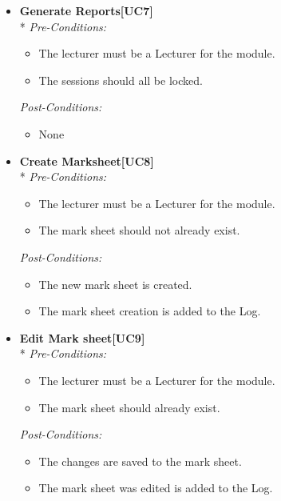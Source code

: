 \documentclass[a4paper]{article}
\begin{document}
\begin{itemize}
				\item	\textbf{Generate Reports[UC7]}\\*
						\textit{Pre-Conditions:}
								\begin{itemize}
									\item The lecturer must be a Lecturer for the module.
									\item The sessions should all be locked.
								\end{itemize}
								
						\textit{Post-Conditions:}
								\begin{itemize}
									\item None
								\end{itemize}
														
				\item	\textbf{Create Marksheet[UC8]}\\*
						\textit{Pre-Conditions:}
								\begin{itemize}
									\item The lecturer must be a Lecturer for the module.
									\item The mark sheet should not already exist.
								\end{itemize}
								
						\textit{Post-Conditions:}
								\begin{itemize}
									\item The new mark sheet is created.
									\item The mark sheet creation is added to the Log.
								\end{itemize}
														
				\item	\textbf{Edit Mark sheet[UC9]}\\*
						\textit{Pre-Conditions:}
								\begin{itemize}
									\item The lecturer must be a Lecturer for the module.
									\item The mark sheet should already exist.
								\end{itemize}
								
						\textit{Post-Conditions:}
								\begin{itemize}
									\item The changes are saved to the mark sheet.
									\item The mark sheet was edited is added to the Log.
								\end{itemize}
														

\end{itemize}
\end{document}

